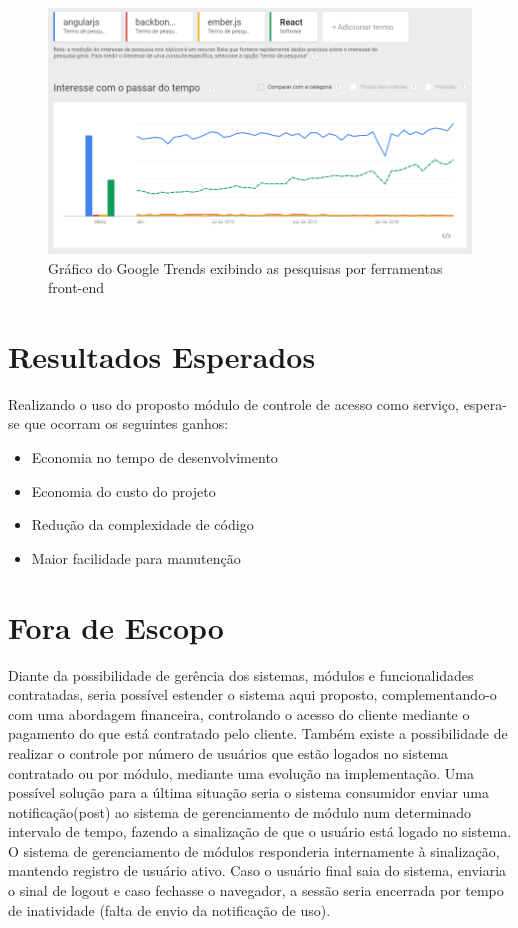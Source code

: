 \begin{figure} %
	\label{fig:graficoGoogleTrendsFerramentasFront}
	\includegraphics[width=1\textwidth]{img/grafico_ferramentas_front}
	\caption{Gráfico do Google Trends exibindo as pesquisas por ferramentas front-end}
\end{figure}


\section{Resultados Esperados}


Realizando o uso do proposto módulo de controle de acesso como serviço, espera-se que ocorram os seguintes ganhos:


\begin{itemize}
	\item Economia no tempo de desenvolvimento
	\item Economia do custo do projeto
	\item Redução da complexidade de código
	\item Maior facilidade para manutenção
\end{itemize}


\section{Fora de Escopo}


Diante da possibilidade de gerência dos sistemas, módulos e funcionalidades contratadas, seria possível estender o sistema aqui proposto, complementando-o com uma abordagem financeira, controlando o acesso do cliente mediante o pagamento do que está contratado pelo cliente. Também existe a possibilidade de realizar o controle por número de usuários que estão logados no sistema contratado ou por módulo, mediante uma evolução na implementação. Uma possível solução para a última situação seria o sistema consumidor enviar uma notificação(post) ao sistema de gerenciamento de módulo num determinado intervalo de tempo, fazendo a sinalização de que o usuário está logado no sistema. O sistema de gerenciamento de módulos responderia internamente à sinalização, mantendo registro de usuário ativo. Caso o usuário final saia do sistema, enviaria o sinal de logout e caso fechasse o navegador, a sessão seria encerrada por tempo de inatividade (falta de envio da notificação de uso).


